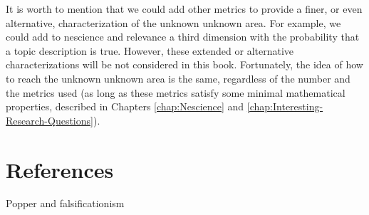 It is worth to mention that we could add other metrics to provide a finer, or even alternative, characterization of the unknown unknown area. For example, we could add to nescience and relevance a third dimension with the probability that a topic description is true. However, these extended or alternative characterizations will be not considered in this book. Fortunately, the idea of how to reach the unknown unknown area is the same, regardless of the number and the metrics used (as long as these metrics satisfy some minimal mathematical properties, described in Chapters \ref{chap:Nescience} and \ref{chap:Interesting-Research-Questions}).

%
%

\section*{References}

Popper and falsificationism

